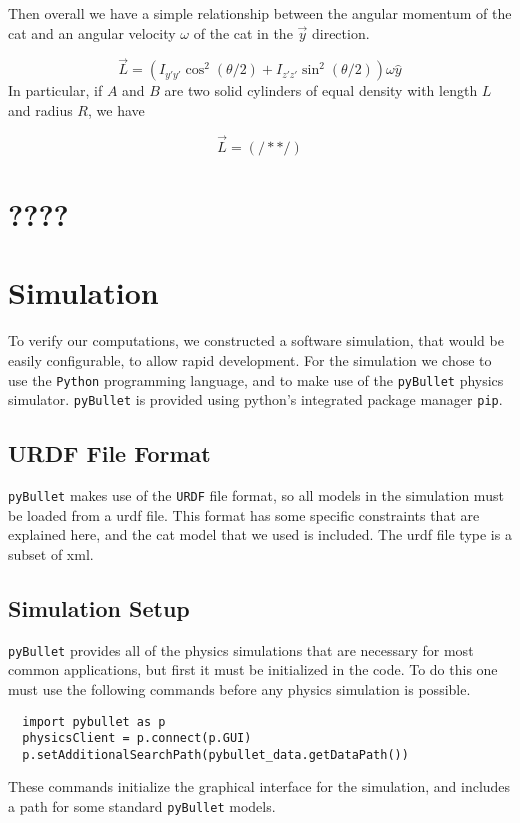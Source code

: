 \documentclass[12]{amsart}
\theoremstyle{definition}
\begin{document}
Then overall we have a simple relationship between the angular momentum of the cat and an angular velocity $\omega$ of the cat in the $\vec{y}$ direction.

\begin{equation}
    \vec{L} = (I_{y'y'} \cos^2(\theta/2) + I_{z'z'} \sin^2(\theta/2))\omega \hat{y}
\end{equation}
In particular, if $A$ and $B$ are two solid cylinders of equal density with length $L$ and radius $R$, we have

\begin{equation}
    \vec{L} = (/**/)
\end{equation}

\section{????}

\section{Simulation}%
\label{sec:simulation}

To verify our computations, we constructed a software simulation, that would be
easily configurable, to allow rapid development. For the simulation we chose to
use the \texttt{Python} programming language, and to make use of the
\texttt{pyBullet} physics simulator. \texttt{pyBullet} is provided using
python's integrated package manager \texttt{pip}.

\subsection{URDF File Format}%
\label{sub:urdf_file_format}

\texttt{pyBullet} makes use of the \texttt{URDF} file format, so all models in
the simulation must be loaded from a urdf file. This format has some specific
constraints that are explained here, and the cat model that we used is
included. The urdf file type is a subset of xml.

\subsection{Simulation Setup}%
\label{sub:simulation_setup}

\texttt{pyBullet} provides all of the physics simulations that are necessary
for most common applications, but first it must be initialized in the code. To
do this one must use the following commands before any physics simulation is
possible.
\begin{verbatim}
  import pybullet as p
  physicsClient = p.connect(p.GUI)
  p.setAdditionalSearchPath(pybullet_data.getDataPath())
\end{verbatim}
These commands initialize the graphical interface for the simulation, and
includes a path for some standard \texttt{pyBullet} models.
\end{document}
